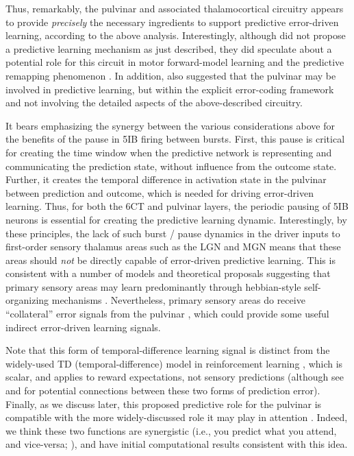 \documentclass[11pt,twoside]{article}
\newif\myifpdf
\begin{document}
Thus, remarkably, the pulvinar and associated thalamocortical circuitry appears to provide \emph{precisely} the necessary ingredients to support predictive error-driven learning, according to the above analysis.  Interestingly, although \citet{ShermanGuillery06} did not propose a predictive learning mechanism as just described, they did speculate about a potential role for this circuit in motor forward-model learning and the predictive remapping phenomenon \citep{ShermanGuillery11,UsreySherman18}.  In addition, \citet{PennartzDoraMuckliEtAl19} also suggested that the pulvinar may be involved in predictive learning, but within the explicit error-coding framework and not involving the detailed aspects of the above-described circuitry.

It bears emphasizing the synergy between the various considerations above for the benefits of the pause in 5IB firing between bursts.  First, this pause is critical for creating the time window when the predictive network is representing and communicating the prediction state, without influence from the outcome state.  Further, it creates the temporal difference in activation state in the pulvinar between prediction and outcome, which is needed for driving error-driven learning.  Thus, for both the 6CT and pulvinar layers, the periodic pausing of 5IB neurons is essential for creating the predictive learning dynamic.  Interestingly, by these principles, the lack of such burst / pause dynamics in the driver inputs to first-order sensory thalamus areas such as the LGN and MGN \citep{ShermanGuillery06} means that these areas should \emph{not} be directly capable of error-driven predictive learning.  This is consistent with a number of models and theoretical proposals suggesting that primary sensory areas may learn predominantly through hebbian-style self-organizing mechanisms \citep{Miller94,Bednar12}.  Nevertheless,  primary sensory areas do receive ``collateral'' error signals from the pulvinar \citep{Shipp03}, which could provide some useful indirect error-driven learning signals.

Note that this form of temporal-difference learning signal is distinct from the widely-used TD (temporal-difference) model in reinforcement learning \citep{SuttonBarto98}, which is scalar, and applies to reward expectations, not sensory predictions (although see \citealp{GardnerSchoenbaumGershman18} and \citealp{Dayan93} for potential connections between these two forms of prediction error).  Finally, as we discuss later, this proposed predictive role for the pulvinar is compatible with the more widely-discussed role it may play in attention \citep{LaBergeBuchsbaum90,BenderYouakim01,SnowAllenRafalEtAl09,SaalmannKastner11,ZhouSchaferDesimone16,FiebelkornKastner19}.  Indeed, we think these two functions are synergistic (i.e., you predict what you attend, and vice-versa; \citealp{RichterdeLange19}), and have initial computational results consistent with this idea.
\end{document}
